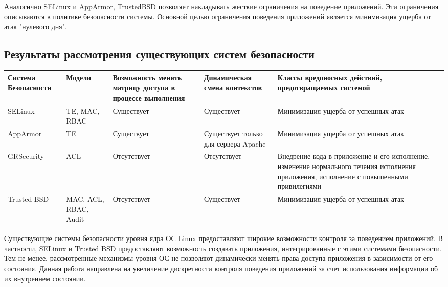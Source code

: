 Аналогично SELinux и AppArmor, TrustedBSD позволяет 
накладывать жесткие ограничения на поведение приложений. 
Эти ограничения описываются в политике безопасности системы.
Основной целью ограничения поведения приложений является 
минимизация ущерба от атак "нулевого дня". 

\newpage
\subsection{Результаты рассмотрения существующих 
систем безопасности} 

\begin{scriptsize}
\bigskip
\begin{center}
\begin{tabular}{|p{2cm}|p{2.5cm}|p{3cm}|p{3cm}|p{3cm}|} 
\hline
Система Безопасности & Модели & Возможность менять матрицу 
доступа в процессе выполнения & 
Динамическая смена контекстов & Классы вредоносных действий,
предотвращаемых системой \\
\hline 
SELinux & TE, MAC, RBAC & Существует & Существует & 
Минимизация ущерба от успешных атак \\
\hline
AppArmor & TE & Существует & Существует только для сервера Apache & 
Минимизация ущерба от успешных атак \\ 
\hline 
GRSecurity & ACL & Отсутствует & Отсутствует & Внедрение кода в приложение 
и его исполнение, изменение нормального течения исполнения приложения, 
исполнение с повышенными привилегиями \\ 
\hline 
Trusted BSD & MAC, ACL, RBAC, Audit & Отсутствует & Существует & 
Минимизация ущерба от успешных атак \\ 
\hline
\end{tabular} 
\end{center} 
\end{scriptsize} 


\bigskip
Существующие системы безопасности уровня ядра ОС Linux 
предоставляют широкие возможности контроля за поведением 
приложений. В частности, SELinux и Trusted BSD 
 предоставляют возможность 
создавать приложения, интегрированные с этими системами 
безопасности. Тем не менее, рассмотренные механизмы уровня 
ОС не позволяют динамически менять права доступа приложения 
в зависимости от его состояния. Данная работа направлена на 
увеличение дискретности контроля поведения приложений за счет 
использования информации об их внутреннем состоянии. 
\bigskip
